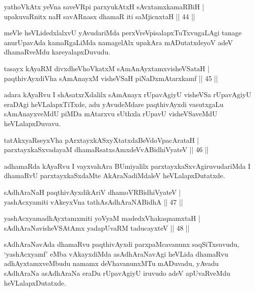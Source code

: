 \begin{shl}
yathoVkAtx yeVna saveVR\s pi parxyukAtxH sAvxtamxkamaRBiH |\\
upakuvaRnitx naH savARnasx dhamaR iti saMjicnxtaH \hfill || 44 ||
\end{shl}

\begin{artha}
meVle heVLidedxlalxvU yAvudariMda perxVreVpisalapxTuTxvugaLAgi tanage anurUpavAda kamaRgaLiMda namagelAlx upakAra mADutatxdeyoV adeV dhamaRveMdu kareyalapxDuvudu.
\end{artha}

\begin{shl}
tasayx kAyaRM divxdheVhoVkatxM sAmAnAyxtamxvisheVSataH |\\
paqthivAyxdiVha sAmAnayxM visheVSaH piNaDxmAtarxkamf \hfill || 45 ||
\end{shl}

\begin{artha}
adara kAyaRvu I shAsatxrXdalilx sAmAnayx rUpavAgiyU visheVSa rUpavAgiyU eraDAgi heVLalapxTiTxde, adu yAvudeMdare paqthivAyxdi vasutxgaLu sAmAnayxveMdU piMDa mAtarxvu sUthxla rUpavU visheVSaveMdU heVLalapxDuvavu.
\end{artha}

\begin{shl}
tatAkxyaRseyxVha pArxtayxkASxyXtatxdaBeVdoVpacArataH |\\
parxtayxkaSxvadayaM dhamaRsatxsAmxdeVvABidhiVyateV \hfill || 46 ||
\end{shl}

\begin{artha}
adhamaRda kAyaRvu I vayxvahAra BUmiyalilx parxtayxkaSxvAgiruvudariMda I dhamaRvU parxtayxkaSxdaMte AkAraNadiMdaleV heVLalapxDutatxde.
\end{artha}

\begin{shl}
sAdhAraNaH paqthivAyxdikAriV dhamoVR\s BidhiVyateV |\\
yashAcxyamiti vAkeyxVna tathA\s sAdhAraNABidhA \hfill || 47 ||
\end{shl}
\begin{shl}
yashAcxyamadhAyxtamxmiti yoV\s yaM madedxVhakaqnamxtaH |\\
sAdhAraNavisheVSAtAmx yadapUvaRM taducayxteV \hfill || 48 ||
\end{shl}

\begin{artha}
sAdhAraNavAda dhamaRvu paqthivAyxdi parxpaMcavanunx saqSiTxsuvudu, `yashAcxyamf' eMba vAkayxdiMda asAdhAraNavAgi heVLida dhamaRvu adhAyxtamxveMbudu namamx deVhavanunxMTu mADuvadu, yAvadu sAdhAraNa asAdhAraNa  eraDu rUpavAgiyU iruvudo adeV apUvaRveMdu heVLalapxDutatxde.
\end{artha}

